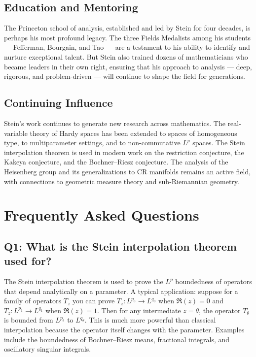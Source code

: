 \subsection{Education and Mentoring}

The Princeton school of analysis, established and led by Stein for four decades, is perhaps his most profound legacy. The three Fields Medalists among his students --- Fefferman, Bourgain, and Tao --- are a testament to his ability to identify and nurture exceptional talent. But Stein also trained dozens of mathematicians who became leaders in their own right, ensuring that his approach to analysis --- deep, rigorous, and problem-driven --- will continue to shape the field for generations.

\subsection{Continuing Influence}

Stein's work continues to generate new research across mathematics. The real-variable theory of Hardy spaces has been extended to spaces of homogeneous type, to multiparameter settings, and to non-commutative \(L^p\) spaces. The Stein interpolation theorem is used in modern work on the restriction conjecture, the Kakeya conjecture, and the Bochner--Riesz conjecture. The analysis of the Heisenberg group and its generalizations to CR manifolds remains an active field, with connections to geometric measure theory and sub-Riemannian geometry.

\section{Frequently Asked Questions}

\subsection*{Q1: What is the Stein interpolation theorem used for?}

The Stein interpolation theorem is used to prove the \(L^p\) boundedness of operators that depend analytically on a parameter. A typical application: suppose for a family of operators \(T_z\) you can prove \(T_z: L^{p_0} \to L^{q_0}\) when \(\Re(z)=0\) and \(T_z: L^{p_1} \to L^{q_1}\) when \(\Re(z)=1\). Then for any intermediate \(z = \theta\), the operator \(T_\theta\) is bounded from \(L^{p_\theta}\) to \(L^{q_\theta}\). This is much more powerful than classical interpolation because the operator itself changes with the parameter. Examples include the boundedness of Bochner--Riesz means, fractional integrals, and oscillatory singular integrals.

